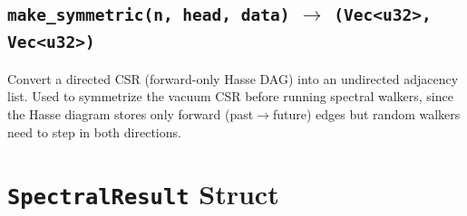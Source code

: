 \documentclass[11pt, a4paper, openany]{book}
\newcommand{\code}[1]{\texttt{#1}}
\newcommand{\func}[1]{\texttt{\color{structure}#1}}
\begin{document}
\subsection{\func{make\_symmetric(n, head, data)} $\to$ \code{(Vec<u32>, Vec<u32>)}}

Convert a directed CSR (forward-only Hasse DAG) into an undirected adjacency
list.  Used to symmetrize the vacuum CSR before running spectral walkers,
since the Hasse diagram stores only forward (past$\to$future) edges but
random walkers need to step in both directions.

\section{\code{SpectralResult} Struct}
\end{document}
